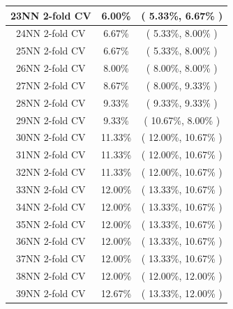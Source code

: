 \documentclass[11pt,a4paper]{article}
\begin{document}
\begin{center}
\begin{tabular} {|| c | c | c ||}
        23NN 2-fold CV & 6.00\% & ( 5.33\%, 6.67\% ) \\ \hline
        24NN 2-fold CV & 6.67\% & ( 5.33\%, 8.00\% ) \\ \hline
        25NN 2-fold CV & 6.67\% & ( 5.33\%, 8.00\% ) \\ \hline
        26NN 2-fold CV & 8.00\% & ( 8.00\%, 8.00\% ) \\ \hline
        27NN 2-fold CV & 8.67\% & ( 8.00\%, 9.33\% ) \\ \hline
        28NN 2-fold CV & 9.33\% & ( 9.33\%, 9.33\% ) \\ \hline
        29NN 2-fold CV & 9.33\% & ( 10.67\%, 8.00\% ) \\ \hline
        30NN 2-fold CV & 11.33\% & ( 12.00\%, 10.67\% ) \\ \hline
        31NN 2-fold CV & 11.33\% & ( 12.00\%, 10.67\% ) \\ \hline
        32NN 2-fold CV & 11.33\% & ( 12.00\%, 10.67\% ) \\ \hline
        33NN 2-fold CV & 12.00\% & ( 13.33\%, 10.67\% ) \\ \hline
        34NN 2-fold CV & 12.00\% & ( 13.33\%, 10.67\% ) \\ \hline
        35NN 2-fold CV & 12.00\% & ( 13.33\%, 10.67\% ) \\ \hline
        36NN 2-fold CV & 12.00\% & ( 13.33\%, 10.67\% ) \\ \hline
        37NN 2-fold CV & 12.00\% & ( 13.33\%, 10.67\% ) \\ \hline
        38NN 2-fold CV & 12.00\% & ( 12.00\%, 12.00\% ) \\ \hline
        39NN 2-fold CV & 12.67\% & ( 13.33\%, 12.00\% ) \\ \hline 
    \end{tabular}
\end{center}
\newpage
\hypertarget{fiveFoldResult}{}
\end{document}
